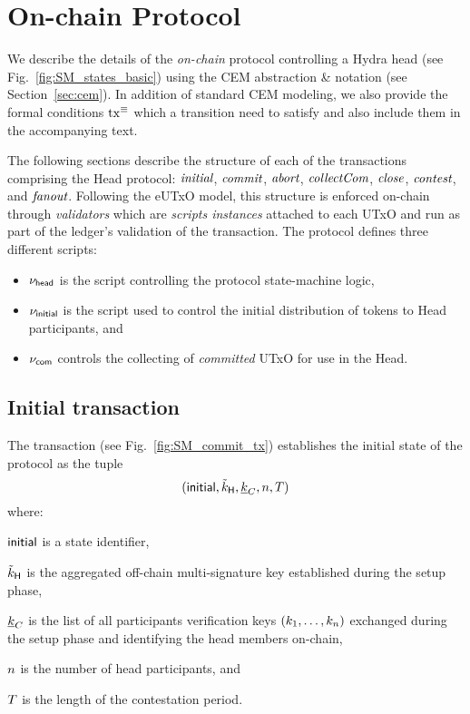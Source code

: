 \section{On-chain Protocol}\label{sec:on-chain}

We describe the details of the \emph{on-chain} protocol controlling a
Hydra head (see Fig.~\ref{fig:SM_states_basic}) using the CEM abstraction \&
notation (see Section~\ref{sec:cem}). In addition of standard CEM modeling, we
also provide the formal conditions $\mathrm{tx}^\equiv$ which a transition need to
satisfy and also include them in the accompanying text.

The following sections describe the structure of each of the transactions comprising the Head protocol: $\textit{initial}{}$, $\textit{commit}{}$, $\textit{abort}{}$, $\textit{collectCom}{}$, $\textit{close}{}$, $\textit{contest}{}$, and $\textit{fanout}{}$. Following the eUTxO model, this structure is enforced on-chain through \emph{validators} which are \emph{scripts instances} attached to each UTxO and run as part of the ledger's validation of the transaction. The protocol defines three different scripts: 
\begin{itemize}
    \item $\nu_\mathsf{head}$ is the script controlling the protocol state-machine logic,
    \item $\nu_\mathsf{initial}$ is the script used to control the initial distribution of tokens to Head participants, and
    \item $\nu_\mathsf{com}$ controls the collecting of \emph{committed} UTxO for use in the Head. 
\end{itemize}

\subsection{Initial transaction} 

The \mtxInit{} transaction (see
Fig.~\ref{fig:SM_commit_tx}) establishes the initial state of the protocol as the tuple
$$
(\mathsf{initial},\tilde{k}_{\mathsf{H}},\underline{k}_C,n,T)
$$ 
where:
\begin{menumerate}
  \item $\mathsf{initial}$ is a state identifier,
  \item $\tilde{k}_{\mathsf{H}}$ is the aggregated off-chain multi-signature key established during the
  setup phase,
  \item $\underline{k}_C$ is the list of all participants verification keys
  $(k_1,\ldots,k_n)$ exchanged during the setup phase and identifying the
  head members on-chain,
  \item $n$ is the number of head participants, and
  \item $T$ is the length of the contestation period.
\end{menumerate} 

